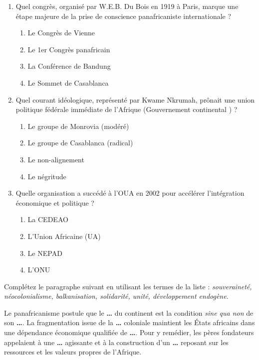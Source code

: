 \documentclass[11pt]{article}
\begin{document}
\begin{exercice}
\begin{enumerate}
    \item Quel congrès, organisé par W.E.B. Du Bois en 1919 à Paris, marque une étape majeure de la prise de conscience panafricaniste internationale ?
    \begin{enumerate}
        \item Le Congrès de Vienne
        \item Le 1er Congrès panafricain
        \item La Conférence de Bandung
        \item Le Sommet de Casablanca
    \end{enumerate}
    \item Quel courant idéologique, représenté par Kwame Nkrumah, prônait une union politique fédérale immédiate de l'Afrique (\og Gouvernement continental \fg) ?
    \begin{enumerate}
        \item Le groupe de Monrovia (modéré)
        \item Le groupe de Casablanca (radical)
        \item Le non-alignement
        \item Le négritude
    \end{enumerate}
    \item Quelle organisation a succédé à l'OUA en 2002 pour accélérer l'intégration économique et politique ?
    \begin{enumerate}
        \item La CEDEAO
        \item L'Union Africaine (UA)
        \item Le NEPAD
        \item L'ONU
    \end{enumerate}
\end{enumerate}
\end{exercice}

\begin{exercice}
Complétez le paragraphe suivant en utilisant les termes de la liste : \textit{souveraineté, néocolonialisme, balkanisation, solidarité, unité, développement endogène}.

Le panafricanisme postule que le \textbf{\dots} du continent est la condition \textit{sine qua non} de son \textbf{\dots}. La fragmentation issue de la \textbf{\dots} coloniale maintient les États africains dans une dépendance économique qualifiée de \textbf{\dots}. Pour y remédier, les pères fondateurs appelaient à une \textbf{\dots} agissante et à la construction d'un \textbf{\dots} reposant sur les ressources et les valeurs propres de l'Afrique.
\end{exercice}
\end{document}
